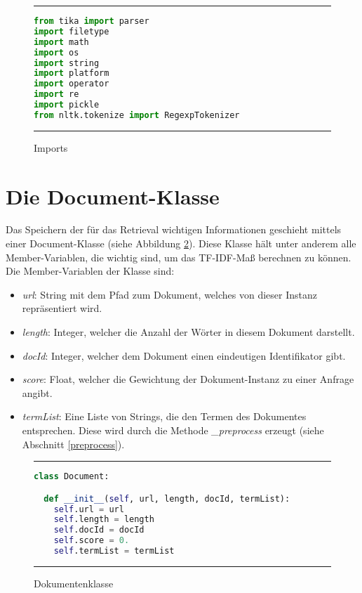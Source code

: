 \begin{figure}
	\rule{\textwidth}{0.4pt}
		\begin{lstlisting}[language=Python]
from tika import parser
import filetype
import math
import os
import string
import platform
import operator
import re
import pickle
from nltk.tokenize import RegexpTokenizer
		\end{lstlisting}
	\rule{\textwidth}{0.4pt}
	\caption{Imports}
	\label{fig:import}
\end{figure}

\section{Die Document-Klasse}\label{die-document-klasse}

Das Speichern der für das Retrieval wichtigen Informationen geschieht mittels einer Document-Klasse (siehe Abbildung \ref{fig:document}). Diese Klasse hält unter anderem alle Member-Variablen, die wichtig sind, um das TF-IDF-Maß berechnen zu können. Die Member-Variablen der Klasse sind:
\begin{itemize}
	\item \textit{url}: String mit dem Pfad zum Dokument, welches von dieser Instanz repräsentiert wird.
	\item \textit{length}: Integer, welcher die Anzahl der Wörter in diesem Dokument darstellt.
	\item \textit{docId}: Integer, welcher dem Dokument einen eindeutigen Identifikator gibt.
	\item \textit{score}: Float, welcher die Gewichtung der Dokument-Instanz zu einer Anfrage angibt.
	\item \textit{termList}: Eine Liste von Strings, die den Termen des Dokumentes entsprechen. Diese wird durch die Methode \textit{\_preprocess} erzeugt (siehe Abschnitt \ref{preprocess}).
\end{itemize} 

\begin{figure}
	\rule{\textwidth}{0.4pt}
		\begin{lstlisting}[language=Python]
class Document:

  def __init__(self, url, length, docId, termList):
    self.url = url
    self.length = length
    self.docId = docId
    self.score = 0.
    self.termList = termList
		\end{lstlisting}
	\rule{\textwidth}{0.4pt}
	\caption{Dokumentenklasse}
	\label{fig:document}
\end{figure}


